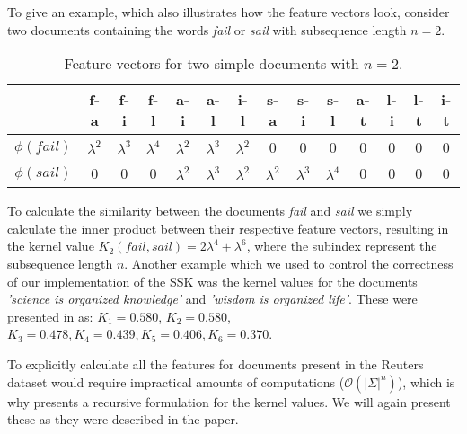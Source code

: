 To give an example, which also illustrates how the feature vectors look, consider two documents containing the words \textit{fail} or \textit{sail} with subsequence length $ n=2 $. 

\begin{table}[h]
	\centering
\begin{tabular}{|c|c|c|c|c|c|c|c|c|c|c|c|c|c|}
	\hline 
	& f-a & f-i & f-l & a-i & a-l & i-l & s-a & s-i & s-l & a-t & l-i & l-t & i-t \\ 
	\hline 
	$\phi(fail)$ & $ \lambda^2 $ & $ \lambda^3 $ &$ \lambda^4 $  &  $ \lambda^2 $& $ \lambda^3 $  & $ \lambda^2 $ & 0 & 0 & 0 & 0 & 0 & 0 & 0 \\ 
	\hline 
	$\phi(sail)$ & 0 & 0 & 0 & $\lambda^2$ & $\lambda^3$ & $\lambda^2$ & $\lambda^2$ & $\lambda^3$ & $\lambda^4$ & 0 & 0 & 0 & 0 \\ 
	\hline 
\end{tabular} 
\caption{Feature vectors for two simple documents with $ n=2 $.\label{tab:exempel}}
\end{table}

To calculate the similarity between the documents \textit{fail} and \textit{sail} we simply calculate the inner product between their respective feature vectors, resulting in the kernel value $ K_2(fail,sail)  = 2\lambda^4 + \lambda^6 $, where the subindex represent the subsequence length $ n $. Another example which we used to control the correctness of our implementation of the SSK was the kernel values for the documents \textit{'science is organized knowledge'} and \textit{'wisdom is organized life'}. These were presented in \cite{lodhi} as: $ K_1 = 0.580 $, $ K_2 = 0.580$, $ K_3 = 0.478, K_4=0.439, K_5 = 0.406, K_6 = 0.370 $.

To explicitly calculate all the features for documents present in the Reuters dataset would require impractical amounts of computations ($ \mathcal{O}(|\Sigma|^n) $), which is why \cite{lodhi} presents a recursive formulation for the kernel values. We will again present these as they were described in the paper.

